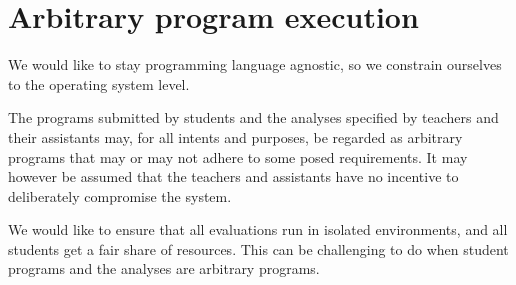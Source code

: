 
\section{Arbitrary program execution}

We would like to stay programming language agnostic, so we constrain ourselves
to the operating system level.

The programs submitted by students and the analyses specified by teachers and
their assistants may, for all intents and purposes, be regarded as arbitrary
programs that may or may not adhere to some posed requirements. It may however
be assumed that the teachers and assistants have no incentive to deliberately
compromise the system.

We would like to ensure that all evaluations run in isolated environments, and
all students get a fair share of resources. This can be challenging to do when
student programs and the analyses are arbitrary programs.

